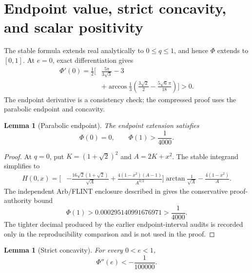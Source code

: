 \documentclass[11pt]{article}
\numberwithin{equation}{section}
\newtheorem{lemma}[theorem]{Lemma}
\theoremstyle{remark}
\begin{document}
\section{Endpoint value, strict concavity, and scalar positivity}
\label{sec:certificate}

The stable formula extends real analytically to \(0\le q\le1\), and hence \(\Phi\) extends to \([0,1]\).  At \(e=0\), exact differentiation gives
\begin{equation}
\begin{aligned}
  \Phi'(0)=\frac12\bigg[&\frac{5\pi}{3\sqrt3}-3\\
  &+\arccos\frac13
  \left(\frac{3\sqrt2}{2}-\frac{5\sqrt6\,\pi}{18}\right)
  \bigg]>0.
\end{aligned}
\label{eq:phi-prime-zero}
\end{equation}
The endpoint derivative is a consistency check; the compressed proof uses the parabolic endpoint and concavity.

\begin{lemma}[Parabolic endpoint]
\label{lem:parabolic-endpoint}
The endpoint extension satisfies
\begin{equation}
  \Phi(0)=0,
  \qquad
  \Phi(1)>\frac1{4000}.
  \label{eq:endpoint-bound}
\end{equation}
\end{lemma}

\begin{proof}
At \(q=0\), put \(K=(1+\sqrt2)^2\) and \(A=2K+x^2\).  The stable integrand simplifies to
\begin{equation}
\begin{aligned}
H(0,x)=\bigg[&-\frac{16\sqrt2(1+\sqrt2)}{\sqrt A}
 +\frac{4(1-x^2)(A-1)}{A^{3/2}}\bigg]
 \arctan\frac1{\sqrt A}
 -\frac{4(1-x^2)}A.
\end{aligned}
\label{eq:endpoint-integrand}
\end{equation}
The independent Arb/FLINT enclosure described in  gives the conservative proof-authority bound
\[
  \Phi(1)>
  0.000295140991676971
  >\frac1{4000}.
\]
The tighter decimal produced by the earlier endpoint-interval audits is recorded only in the reproducibility comparison and is not used in the proof.
\end{proof}

\begin{lemma}[Strict concavity]
\label{lem:concavity}
For every \(0<e<1\),
\begin{equation}
  \Phi''(e)<-\frac1{100000}.
  \label{eq:concavity-bound}
\end{equation}
\end{lemma}
\end{document}
